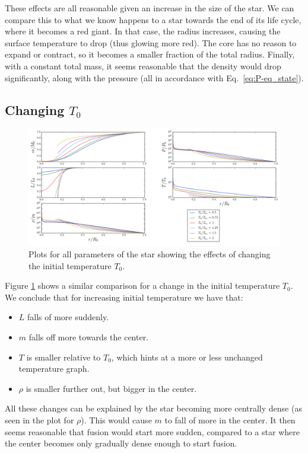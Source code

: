 \documentclass[11pt,twocolumn]{article}
\begin{document}
These effects are all reasonable given an increase in the size of the
star. We can compare this to what we know happens to a star towards the
end of its life cycle, where it becomes a red giant. In that case, the
radius increases, causing the surface temperature to drop (thus
glowing more red). The core has no reason to expand or contract, so it
becomes a smaller fraction of the total radius. Finally, with a constant total mass, it seems reasonable
that the density would drop significantly, along with the pressure
(all in accordance with Eq.~\eqref{eq:P-eq_state}). 


\subsection{Changing $T_0$}

\begin{figure}[ht]
  \centering
  \includegraphics[width=\linewidth]{fig/T_variation.png}
  \caption{\label{fig:T-variation} Plots for all parameters of the star
  showing the effects of changing the initial temperature $T_0$.}
\end{figure}

Figure \ref{fig:T-variation} shows a similar comparison for a change
in the initial temperature $T_0$. We conclude that for increasing
initial temperature we have that:

\begin{itemize}
  \item $L$ falls of more suddenly.
  \item $m$ falls off more towards the center.
  \item $T$ is smaller relative to $T_0$, which hints at a more or
    less unchanged temperature graph.
  \item $\rho$ is smaller further out, but bigger in the center.
\end{itemize}

All these changes can be explained by the star becoming more centrally
dense (as seen in the plot for $\rho$). This would cause $m$ to fall
of more in the center. It then seems reasonable that fusion would
start more sudden, compared to a star where the center becomes only
gradually dense enough to start fusion.
\end{document}

